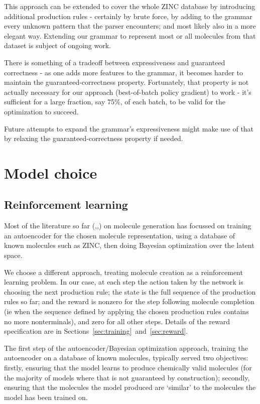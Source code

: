 \documentclass[11pt]{article}
\begin{document}
This approach can be extended to cover the whole ZINC database by introducing additional production rules - certainly by brute force, by adding to the grammar every unknown pattern that the parser encounters; and most likely also in a more elegant way. Extending our grammar to represent most or all molecules from that dataset is subject of ongoing work.

There is something of a tradeoff between expressiveness and guaranteed correctness - as one adds more features to the grammar, it becomes harder to maintain the guaranteed-correctness property. Fortunately, that property is not actually necessary for our approach (best-of-batch policy gradient) to work - it's sufficient for a large fraction, say 75\%, of each batch, to be valid for the optimization to succeed.

Future attempts to expand the grammar's expressiveness might make use of that by relaxing the guaranteed-correctness property if needed.



\section{Model choice}
\subsection{Reinforcement learning}
Most of the literature so far (\cite{Gomez-Bombarelli16},\cite{kusner17},\cite{jin18}) on molecule generation has focussed on training an autoencoder for the chosen molecule representation, using a database of known molecules such as ZINC, then doing Bayesian optimization over the latent space. 

We choose a different approach, treating molecule creation as a reinforcement learning problem. In our case, at each step the action taken by the network is choosing the next production rule; the state is the full sequence of the production rules so far; and the reward is nonzero for the step following molecule completion (ie when the sequence defined by applying the chosen production rules contains no more nonterminals), and zero for all other steps. Details of the reward specification are in Sections~\ref{sec:training}~and~\ref{sec:reward}.

The first step of the autoencoder/Bayesian optimization approach, training the autoencoder on a database of known molecules, typically served two objectives: firstly, ensuring that the model learns to produce chemically valid molecules (for the majority of models where that is not guaranteed by construction); secondly, ensuring that the molecules the model produced are `similar' to the molecules the model has been trained on.
\end{document}
